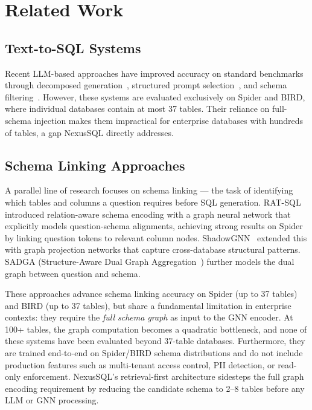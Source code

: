 \documentclass[conference]{IEEEtran}
\begin{document}
\section{Related Work}
\label{sec:related}

\subsection{Text-to-SQL Systems}

Recent LLM-based approaches have improved accuracy on standard
benchmarks through decomposed generation~\cite{dinsql}, structured
prompt selection~\cite{dailsql}, and schema filtering~\cite{chess}.
However, these systems are evaluated exclusively on Spider and BIRD,
where individual databases contain at most 37 tables. Their reliance
on full-schema injection makes them impractical for enterprise databases
with hundreds of tables, a gap NexusSQL directly addresses.

\subsection{Schema Linking Approaches}

A parallel line of research focuses on schema linking --- the task of
identifying which tables and columns a question requires before SQL
generation. RAT-SQL~\cite{ratsql} introduced relation-aware schema
encoding with a graph neural network that explicitly models question-schema
alignments, achieving strong results on Spider by linking question tokens
to relevant column nodes. ShadowGNN~\cite{shadowgnn} extended this with
graph projection networks that capture cross-database structural patterns.
SADGA (Structure-Aware Dual Graph Aggregation~\cite{sadga}) further
models the dual graph between question and schema.

These approaches advance schema linking accuracy on Spider (up to 37
tables) and BIRD (up to 37 tables), but share a fundamental limitation
in enterprise contexts: they require the \emph{full schema graph} as
input to the GNN encoder. At 100+ tables, the graph computation becomes
a quadratic bottleneck, and none of these systems have been evaluated
beyond 37-table databases. Furthermore, they are trained end-to-end on
Spider/BIRD schema distributions and do not include production features
such as multi-tenant access control, PII detection, or read-only
enforcement. NexusSQL's retrieval-first architecture sidesteps the full
graph encoding requirement by reducing the candidate schema to 2--8
tables before any LLM or GNN processing.
\end{document}
